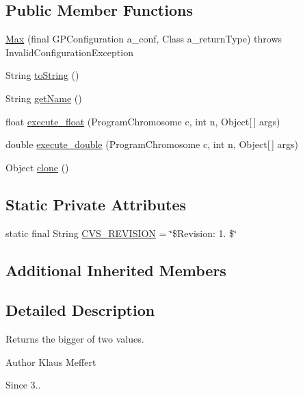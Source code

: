 \subsection*{Public Member Functions}
\begin{DoxyCompactItemize}
\item 
\hyperlink{classorg_1_1jgap_1_1gp_1_1function_1_1_max_a3759c692b53f5fefe4a5c8fdae25eec9}{Max} (final G\-P\-Configuration a\-\_\-conf, Class a\-\_\-return\-Type)  throws Invalid\-Configuration\-Exception 
\item 
String \hyperlink{classorg_1_1jgap_1_1gp_1_1function_1_1_max_a1d48fda9902bb68bb94672c5636ac27e}{to\-String} ()
\item 
String \hyperlink{classorg_1_1jgap_1_1gp_1_1function_1_1_max_a2ac171fd2de27285b42835178a1862d9}{get\-Name} ()
\item 
float \hyperlink{classorg_1_1jgap_1_1gp_1_1function_1_1_max_afc7042d2ab66b546a7cb78fd5fb5a773}{execute\-\_\-float} (Program\-Chromosome c, int n, Object\mbox{[}$\,$\mbox{]} args)
\item 
double \hyperlink{classorg_1_1jgap_1_1gp_1_1function_1_1_max_a840fb5b567b2cfe209ee92bb3c35c621}{execute\-\_\-double} (Program\-Chromosome c, int n, Object\mbox{[}$\,$\mbox{]} args)
\item 
Object \hyperlink{classorg_1_1jgap_1_1gp_1_1function_1_1_max_af8cc35ac751c35864868d878562d0a0b}{clone} ()
\end{DoxyCompactItemize}
\subsection*{Static Private Attributes}
\begin{DoxyCompactItemize}
\item 
static final String \hyperlink{classorg_1_1jgap_1_1gp_1_1function_1_1_max_ac6c7a7abc2587e2e7f6498d6b2580887}{C\-V\-S\-\_\-\-R\-E\-V\-I\-S\-I\-O\-N} = \char`\"{}\$Revision\-: 1. \$\char`\"{}
\end{DoxyCompactItemize}
\subsection*{Additional Inherited Members}


\subsection{Detailed Description}
Returns the bigger of two values.

\begin{DoxyAuthor}{Author}
Klaus Meffert 
\end{DoxyAuthor}
\begin{DoxySince}{Since}
3.. 
\end{DoxySince}


